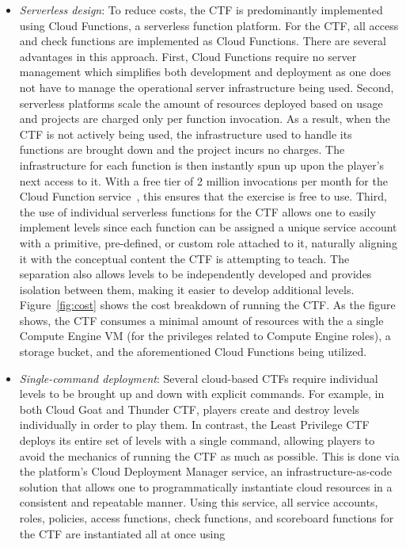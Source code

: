 \begin{itemize}
  \item {\em Serverless design}: To reduce costs, the CTF is predominantly implemented using Cloud Functions, a serverless function platform.  For the CTF, all access and check functions are implemented as Cloud Functions.  There are several advantages in this approach.  First, Cloud Functions require no server management which
  simplifies both development and deployment as one does not have to manage the operational server infrastructure being used.  Second, serverless platforms
  scale the amount of resources deployed based on usage and projects are charged only per function invocation.  As a result, when the CTF is not actively being used, the infrastructure used to handle its functions are brought down and
  the project incurs no charges.  The infrastructure for each function is then instantly spun up upon the player's next access to it.
  With a free tier of 2 million invocations per month for the Cloud Function service~\cite{https://cloud.google.com/free}, this ensures that the exercise
  is free to use.  Third, the use of individual serverless functions for the CTF allows one to easily implement levels since each function can be assigned
  a unique service account with a primitive, pre-defined, or custom role attached to it, naturally aligning it with the conceptual content the CTF is attempting to teach.  The separation also allows levels to be independently developed and provides isolation between them, making it easier to develop additional levels.
  Figure~\ref{fig:cost} shows the cost breakdown of running the CTF.  As the figure shows, the CTF consumes a minimal amount of resources with the a single
  Compute Engine VM (for the privileges related to Compute Engine roles), a storage bucket, and the aforementioned Cloud Functions being utilized.
  \item {\em Single-command deployment}: Several cloud-based CTFs require individual levels to be brought up and down with explicit commands.  For example, in both Cloud Goat and Thunder CTF, players create and destroy levels individually in order to play them.  In contrast, the Least Privilege CTF deploys its entire set of levels with a single command, allowing players to avoid the mechanics of running the CTF as much as possible.  This is done via the platform's Cloud Deployment
  Manager service, an infrastructure-as-code solution that allows one to programmatically instantiate cloud resources in a consistent and repeatable manner.  Using
  this service, all service accounts, roles, policies, access functions, check functions, and scoreboard functions for the CTF are instantiated all at once using

\end{itemize}
